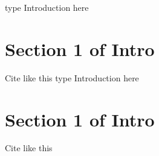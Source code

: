 type Introduction here

\section{Section 1 of Intro}
Cite like this \cite{8748678}type Introduction here

\section{Section 1 of Intro}
Cite like this \cite{8748678}
